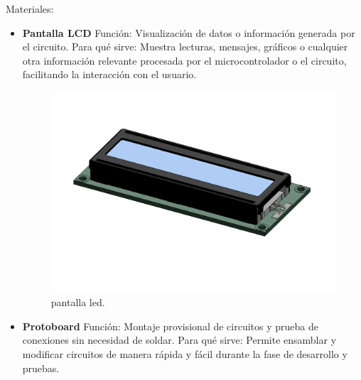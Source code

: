     Materiales:
    \begin{itemize}
    \item \textbf{Pantalla LCD}
    Función: Visualización de datos o información generada por el circuito.
    Para qué sirve: Muestra lecturas, mensajes, gráficos o cualquier otra información relevante procesada por el microcontrolador o el circuito, facilitando la interacción con el usuario.
    \begin{figure}[H]
        \centering
        \includegraphics[scale=0.30]{1/img/Pantalla Led.pdf}
        \caption{pantalla led.}
    \end{figure}
    \item \textbf{Protoboard}
    Función: Montaje provisional de circuitos y prueba de conexiones sin necesidad de soldar.
    Para qué sirve: Permite ensamblar y modificar circuitos de manera rápida y fácil durante la fase de desarrollo y pruebas.
    \begin{figure}[H]
        \centering

\end{figure}
\end{itemize}

